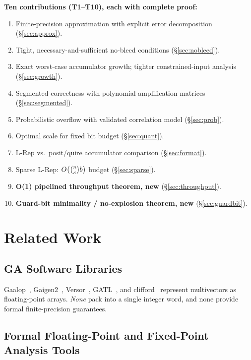 \documentclass[11pt,a4paper]{article}
\theoremstyle{definition}
\theoremstyle{plain}
\theoremstyle{remark}
\begin{document}
\begin{contribution}
\textbf{Ten contributions (T1--T10), each with complete proof:}
\begin{enumerate}[label=C\arabic*.]
  \item Finite-precision approximation with explicit error decomposition (\S\ref{sec:approx}).
  \item Tight, necessary-and-sufficient no-bleed conditions (\S\ref{sec:nobleed}).
  \item Exact worst-case accumulator growth; tighter constrained-input analysis (\S\ref{sec:growth}).
  \item Segmented correctness with polynomial amplification matrices (\S\ref{sec:segmented}).
  \item Probabilistic overflow with validated correlation model (\S\ref{sec:prob}).
  \item Optimal scale for fixed bit budget (\S\ref{sec:quant}).
  \item L-Rep vs.\ posit/quire accumulator comparison (\S\ref{sec:format}).
  \item Sparse L-Rep: $O\!\left(\tbinom{n}{\kappa}b\right)$ budget (\S\ref{sec:sparse}).
  \item \textbf{O(1) pipelined throughput theorem, new} (\S\ref{sec:throughput}).
  \item \textbf{Guard-bit minimality / no-explosion theorem, new} (\S\ref{sec:guardbit}).
\end{enumerate}
\end{contribution}

\section{Related Work}
\label{sec:related}

\subsection{GA Software Libraries}

Gaalop~\cite{gaalop}, Gaigen2~\cite{fontijne2007}, Versor~\cite{versor},
GATL~\cite{gatl}, and clifford~\cite{clifford_py} represent multivectors
as floating-point arrays.
\emph{None} pack into a single integer word, and none provide formal
finite-precision guarantees.

\subsection{Formal Floating-Point and Fixed-Point Analysis Tools}
\label{sec:related-formal}
\end{document}
